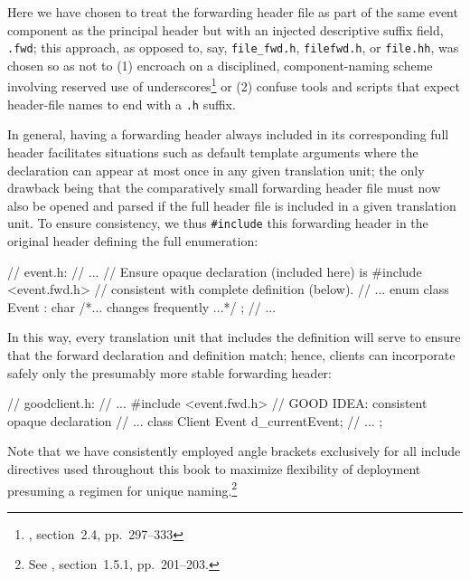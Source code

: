 \noindent Here we have chosen to treat the forwarding header file as part of the same event component as the principal header but with an injected descriptive suffix field, \lstinline!.fwd!; this approach, as opposed to, say, \lstinline!file_fwd.h!, \lstinline!filefwd.h!, or \lstinline!file.hh!, was chosen so as not to (1) encroach on a disciplined, component-naming scheme involving reserved use of underscores\footnote{\cite{lakos20}, section~2.4, pp.~297--333} or (2) confuse tools and scripts that expect header-file names to end with a \lstinline!.h! suffix.

In general, having a forwarding header always included in its
corresponding full header facilitates situations such as default
template arguments where the declaration can appear at most once in any
given translation unit; the only drawback being that the
comparatively small forwarding header file must now also be opened and
parsed if the full header file is included in a given translation
unit. To ensure consistency, we thus \lstinline!#include! this forwarding
header in the original header defining the full enumeration:

\begin{emcppslisting}[emcppsbatch=e7]
// event.h:
// ...                  // Ensure opaque declaration (included here) is
#include <event.fwd.h>  // consistent with complete definition (below).
// ...
enum class Event : char { /*... changes frequently ...*/ };
// ...
\end{emcppslisting}

\noindent In this way, every translation unit that includes the definition will
serve to ensure that the forward declaration and definition match;
hence, clients can incorporate safely only the presumably more stable
forwarding header:

\begin{emcppslisting}[emcppsbatch=e7]
// goodclient.h:
// ...
#include <event.fwd.h>  // GOOD IDEA: consistent opaque declaration
// ...
class Client
{
    Event d_currentEvent;
    // ...
};
\end{emcppslisting}

\noindent Note that we have consistently
employed angle brackets exclusively for all include directives used
throughout this book to maximize flexibility of deployment presuming a
  regimen for unique naming.\footnote{See \cite{lakos20}, section~1.5.1,
  pp.~201--203.}

